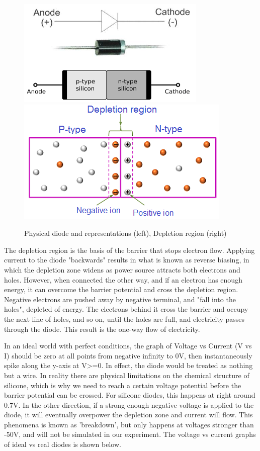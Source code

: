 \documentclass[a4paper]{article}
\begin{document}
\begin{figure}[H]
\centering
\includegraphics[scale=0.75]{Diodes2.PNG}\includegraphics[scale=0.6]{Depletion.PNG}
\caption{\label{fig} Physical diode and representations (left), Depletion region (right)}
\end{figure}

The depletion region is the basis of the barrier that stops electron flow. Applying current to the diode "backwards" results in what is known as reverse biasing, in which the depletion zone widens as power source attracts both electrons and holes. However, when connected the other way, and if an electron has enough energy, it can overcome the barrier potential and cross the depletion region. Negative electrons are pushed away by negative terminal, and "fall into the holes", depleted of energy. The electrons behind it cross the barrier and occupy the next line of holes, and so on, until the holes are full, and electricity passes through the diode. This result is the one-way flow of electricity. 

In an ideal world with perfect conditions, the graph of Voltage vs Current (V vs I) should be zero at all points from negative infinity to 0V, then instantaneously spike along the y-axis at V>=0. In effect, the diode would be treated as nothing but a wire. In reality there are physical limitations on the chemical structure of silicone, which is why we need to reach a certain voltage potential before the barrier potential can be crossed. For silicone diodes, this happens at right around 0.7V. In the other direction, if a strong enough negative voltage is applied to the diode, it will eventually overpower the depletion zone and current will flow. This phenomena is known as 'breakdown', but only happens at voltages stronger than -50V, and will not be simulated in our experiment. The voltage vs current graphs of ideal vs real diodes is shown below. 
\end{document}
